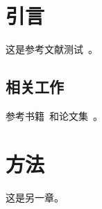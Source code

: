 \documentclass[degree=bachelor]{sduthesis}
\begin{document}
\chapter{引言}
这是参考文献测试~\cite{zhang2020}。

\section{相关工作}
参考书籍~\cite{book2021}和论文集~\cite{inproceedings2022}。

\chapter{方法}
这是另一章。



\end{document}
